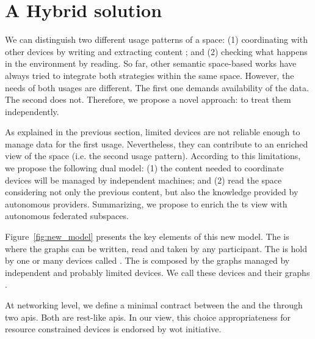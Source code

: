 \section{A Hybrid solution} %
\label{sec:hybrid_solution}

We can distinguish two different usage patterns of a space:
(1) coordinating with other devices by writing and extracting content ; and %
(2) checking what happens in the environment by reading.
So far, other semantic space-based works have always tried to integrate both strategies within the same space.
However, the needs of both usages are different.
The first one demands availability of the data.
The second does not. %
Therefore, we propose a novel approach: to treat them independently.



As explained in the previous section, limited devices are not reliable enough to manage data for the first usage.
Nevertheless, they can contribute to an enriched view of the space (i.e. the second usage pattern).
According to this limitations, we propose the following dual model:
(1) the content needed to coordinate devices will be managed by independent machines; and
(2) read the space considering not only the previous content, but also the knowledge provided by autonomous providers.
Summarizing, we propose to enrich the \ac{ts} view with autonomous federated subspaces.


Figure~\ref{fig:new_model} presents the key elements of this new model.
The \coordspace{} is where the graphs can be written, read and taken by any participant.
The \coordspace{} is hold by one or many devices called \coordinators{}.
The \outerspace{} is composed by the graphs managed by independent and probably limited devices.
We call these devices \asteroids{} and their graphs \selfgraphs{}.



At networking level, we define a minimal contract between the \asteroids{} and the \coordinators{} through two \acp{api}.
Both are \ac{rest}-like \acp{api}.
In our view, this choice appropriateness for resource constrained devices is endorsed by \ac{wot} initiative.


